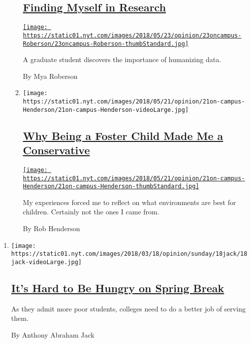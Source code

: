 \begin{enumerate}
\begin{enumerate}
    \hypertarget{finding-myself-in-research}{%
    \subsection{\texorpdfstring{\href{/2018/05/23/opinion/graduate-student-cancer-research.html}{Finding
    Myself in
    Research}}{Finding Myself in Research}}\label{finding-myself-in-research}}

    \href{/2018/05/23/opinion/graduate-student-cancer-research.html}{\texttt{[image: https://static01.nyt.com/images/2018/05/23/opinion/23oncampus-Roberson/23oncampus-Roberson-thumbStandard.jpg]}}

    A graduate student discovers the importance of humanizing data.

    By Mya Roberson
  \item
    \texttt{[image: https://static01.nyt.com/images/2018/05/21/opinion/21on-campus-Henderson/21on-campus-Henderson-videoLarge.jpg]}

    \hypertarget{why-being-a-foster-child-made-me-a-conservative}{%
    \subsection{\texorpdfstring{\href{/2018/05/21/opinion/foster-child-conservative.html}{Why
    Being a Foster Child Made Me a
    Conservative}}{Why Being a Foster Child Made Me a Conservative}}\label{why-being-a-foster-child-made-me-a-conservative}}

    \href{/2018/05/21/opinion/foster-child-conservative.html}{\texttt{[image: https://static01.nyt.com/images/2018/05/21/opinion/21on-campus-Henderson/21on-campus-Henderson-thumbStandard.jpg]}}

    My experiences forced me to reflect on what environments are best
    for children. Certainly not the ones I came from.

    By Rob Henderson
  \end{enumerate}
\end{enumerate}

\begin{enumerate}
\def\labelenumi{\arabic{enumi}.}
\item
  \texttt{[image: https://static01.nyt.com/images/2018/03/18/opinion/sunday/18jack/18jack-videoLarge.jpg]}

  \hypertarget{its-hard-to-be-hungry-on-spring-break}{%
  \subsection{\texorpdfstring{\href{/2018/03/17/opinion/sunday/spring-break-colleges-poor-students.html}{It's
  Hard to Be Hungry on Spring
  Break}}{It's Hard to Be Hungry on Spring Break}}\label{its-hard-to-be-hungry-on-spring-break}}

  As they admit more poor students, colleges need to do a better job of
  serving them.

  By Anthony Abraham Jack
\end{enumerate}

